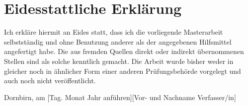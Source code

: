 \documentclass[a4paper,12pt,twoside]{scrreprt}
\begin{document}
\chapter*{Eidesstattliche Erklärung}
Ich erkläre hiermit an Eides statt, dass ich die vorliegende Masterarbeit selbstständig und ohne Benutzung anderer als der angegebenen Hilfsmittel angefertigt habe. Die aus fremden Quellen direkt oder indirekt übernommenen Stellen sind als solche kenntlich gemacht. Die Arbeit wurde bisher weder in gleicher noch in ähnlicher Form einer anderen Prüfungsbehörde vorgelegt und auch noch nicht veröffentlicht.

\vspace{3cm}
\noindent
Dornbirn, am [Tag. Monat Jahr anführen]\hfill [Vor- und Nachname Verfasser/in]
\end{document}
